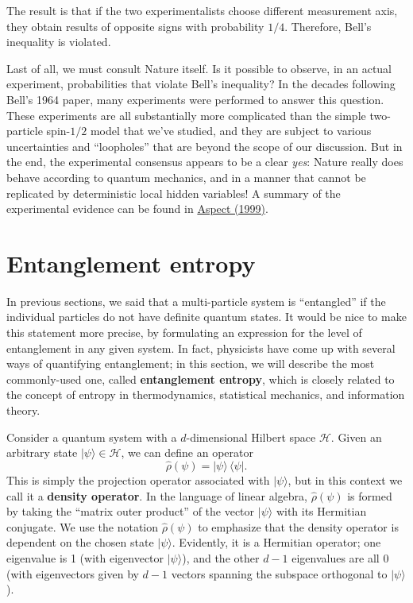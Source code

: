 \documentclass[pra,12pt]{revtex4}
\begin{document}
The result is that if the two experimentalists choose different
measurement axis, they obtain results of opposite signs with
probability $1/4$.  Therefore, Bell's inequality is violated.

Last of all, we must consult Nature itself.  Is it possible to
observe, in an actual experiment, probabilities that violate Bell's
inequality?  In the decades following Bell's 1964 paper, many
experiments were performed to answer this question.  These experiments
are all substantially more complicated than the simple two-particle
spin-$1/2$ model that we've studied, and they are subject to various
uncertainties and ``loopholes'' that are beyond the scope of our
discussion.  But in the end, the experimental consensus appears to be
a clear \textit{yes}: Nature really does behave according to quantum
mechanics, and in a manner that cannot be replicated by deterministic
local hidden variables!  A summary of the experimental evidence can be
found in \hyperref[cite:aspect]{Aspect (1999)}.

\section{Entanglement entropy}
\label{sec:entropy}

In previous sections, we said that a multi-particle system is
``entangled'' if the individual particles do not have definite quantum
states.  It would be nice to make this statement more precise, by
formulating an expression for the level of entanglement in any given
system.  In fact, physicists have come up with several ways of
quantifying entanglement; in this section, we will describe the most
commonly-used one, called \textbf{entanglement entropy}, which is
closely related to the concept of entropy in thermodynamics,
statistical mechanics, and information theory.

Consider a quantum system with a $d$-dimensional Hilbert space
$\mathscr{H}$.  Given an arbitrary state $|\psi\rangle \in
\mathscr{H}$, we can define an operator
\begin{equation}
  \hat{\rho}(\psi) = |\psi\rangle\, \langle\psi|.
\end{equation}
This is simply the projection operator associated with $|\psi\rangle$,
but in this context we call it a \textbf{density operator}.  In the
language of linear algebra, $\hat{\rho}(\psi)$ is formed by taking the
``matrix outer product'' of the vector $|\psi\rangle$ with its
Hermitian conjugate.  We use the notation $\hat{\rho}(\psi)$ to
emphasize that the density operator is dependent on the chosen state
$|\psi\rangle$.  Evidently, it is a Hermitian operator; one eigenvalue
is 1 (with eigenvector $|\psi\rangle$), and the other $d-1$
eigenvalues are all $0$ (with eigenvectors given by $d-1$ vectors
spanning the subspace orthogonal to $|\psi\rangle$).
\end{document}
